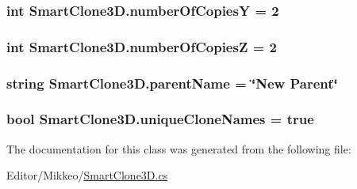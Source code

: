 \subsubsection[{\texorpdfstring{number\+Of\+CopiesY}{numberOfCopiesY}}]{\setlength{\rightskip}{0pt plus 5cm}int Smart\+Clone3\+D.\+number\+Of\+CopiesY = 2}\hypertarget{class_smart_clone3_d_a4fa0d599eba1d41fbb13a2bac4555879}{}\label{class_smart_clone3_d_a4fa0d599eba1d41fbb13a2bac4555879}
\subsubsection[{\texorpdfstring{number\+Of\+CopiesZ}{numberOfCopiesZ}}]{\setlength{\rightskip}{0pt plus 5cm}int Smart\+Clone3\+D.\+number\+Of\+CopiesZ = 2}\hypertarget{class_smart_clone3_d_a98255258a2ddaf81997657dfb2f07bf3}{}\label{class_smart_clone3_d_a98255258a2ddaf81997657dfb2f07bf3}
\subsubsection[{\texorpdfstring{parent\+Name}{parentName}}]{\setlength{\rightskip}{0pt plus 5cm}string Smart\+Clone3\+D.\+parent\+Name = \char`\"{}New Parent\char`\"{}}\hypertarget{class_smart_clone3_d_ab9b7fe38fae95d726e25ed6301188ec4}{}\label{class_smart_clone3_d_ab9b7fe38fae95d726e25ed6301188ec4}
\subsubsection[{\texorpdfstring{unique\+Clone\+Names}{uniqueCloneNames}}]{\setlength{\rightskip}{0pt plus 5cm}bool Smart\+Clone3\+D.\+unique\+Clone\+Names = true}\hypertarget{class_smart_clone3_d_a4c7f8673f0a130f63798c3161048f94b}{}\label{class_smart_clone3_d_a4c7f8673f0a130f63798c3161048f94b}


The documentation for this class was generated from the following file\+:\begin{DoxyCompactItemize}
\item 
Editor/\+Mikkeo/\hyperlink{_smart_clone3_d_8cs}{Smart\+Clone3\+D.\+cs}\end{DoxyCompactItemize}
